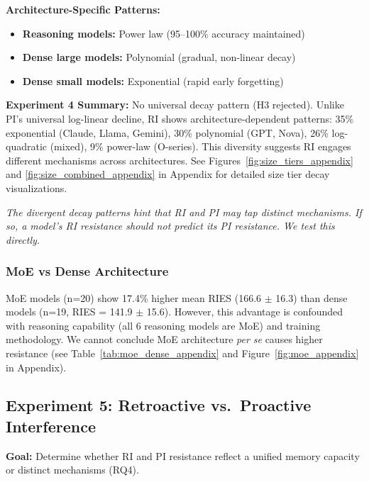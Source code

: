 \documentclass{article}
\begin{document}
\textbf{Architecture-Specific Patterns:}
\begin{itemize}[itemsep=2pt,topsep=3pt,parsep=0pt]
    \item \textbf{Reasoning models:} Power law (95--100\% accuracy maintained)
    \item \textbf{Dense large models:} Polynomial (gradual, non-linear decay)
    \item \textbf{Dense small models:} Exponential (rapid early forgetting)
\end{itemize}

\textbf{Experiment 4 Summary:} No universal decay pattern (H3 rejected). Unlike PI's universal log-linear decline, RI shows architecture-dependent patterns: 35\% exponential (Claude, Llama, Gemini), 30\% polynomial (GPT, Nova), 26\% log-quadratic (mixed), 9\% power-law (O-series). This diversity suggests RI engages different mechanisms across architectures. See Figures~\ref{fig:size_tiers_appendix} and \ref{fig:size_combined_appendix} in Appendix for detailed size tier decay visualizations.

\vspace{3pt}
\noindent\textit{The divergent decay patterns hint that RI and PI may tap distinct mechanisms. If so, a model's RI resistance should not predict its PI resistance. We test this directly.}
\vspace{3pt}

\subsubsection{MoE vs Dense Architecture}

MoE models (n=20) show 17.4\% higher mean RIES (166.6 $\pm$ 16.3) than dense models (n=19, RIES = 141.9 $\pm$ 15.6). However, this advantage is confounded with reasoning capability (all 6 reasoning models are MoE) and training methodology. We cannot conclude MoE architecture \textit{per se} causes higher resistance (see Table~\ref{tab:moe_dense_appendix} and Figure~\ref{fig:moe_appendix} in Appendix).

\subsection{Experiment 5: Retroactive vs.\ Proactive Interference}
\label{exp:ri_vs_pi}

\textbf{Goal:} Determine whether RI and PI resistance reflect a unified memory capacity or distinct mechanisms (RQ4).
\end{document}
